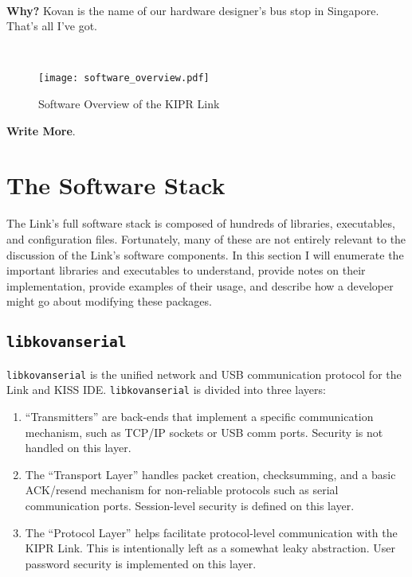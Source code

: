\documentclass[12pt,letterpaper]{article}
\newcommand{\bcolorbox}[4]{\noindent \\ \fcolorbox{#1}{#2} {\parbox{\textwidth}{\vspace{.1em}\textbf{#3} #4\vspace{.1em}}} \\}
\newcommand{\why}[1]{\bcolorbox{black}{GhostWhite}{Why?}{#1}}
\begin{document}
	\why{Kovan is the name of our hardware designer's bus stop in Singapore. That's all I've got.}
	
	\begin{figure}[H]
		\begin{center}
			\texttt{[image: software\_overview.pdf]}
			\caption{Software Overview of the KIPR Link}
		\end{center}
	\end{figure}
	
	\textbf{Write More}.
	
	\section{The Software Stack}
	
	The Link's full software stack is composed of hundreds of libraries, executables, and configuration files. Fortunately, many of these
	are not entirely relevant to the discussion of the Link's software components. In this section I will enumerate the important libraries
	and executables to understand, provide notes on their implementation, provide examples of their usage, and describe how a developer
	might go about modifying these packages.
	
	\subsection{\texttt{libkovanserial}}
	\texttt{libkovanserial} is the unified network and USB communication protocol for the Link and KISS IDE.
	\texttt{libkovanserial} is divided into three layers:
	\begin{enumerate}
		\setlength{\itemsep}{0em}
		\item ``Transmitters'' are back-ends that implement a specific communication mechanism, such as TCP/IP sockets or USB comm ports.
		Security is not handled on this layer.
		\item The ``Transport Layer'' handles packet creation, checksumming, and a basic ACK/resend mechanism for non-reliable protocols such
		as serial communication ports. Session-level security is defined on this layer.
		\item The ``Protocol Layer'' helps facilitate protocol-level communication with the KIPR Link. This is intentionally left
		as a somewhat leaky abstraction. User password security is implemented on this layer.
	\end{enumerate}
	
\end{document}
